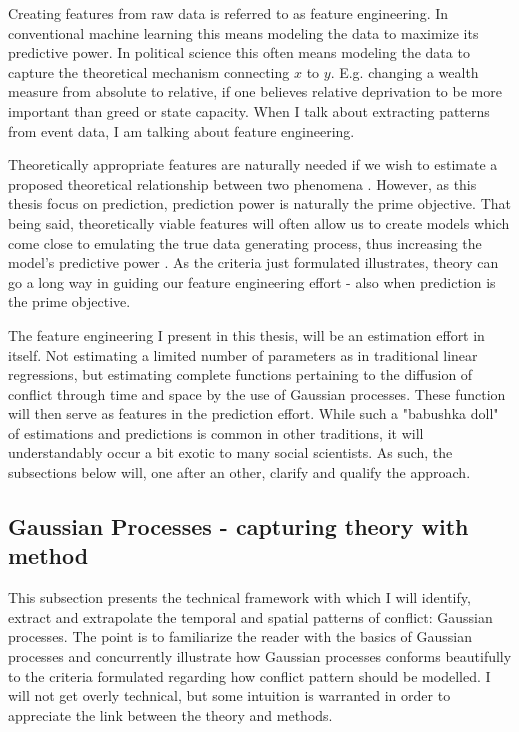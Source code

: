 \documentclass[a4paper]{article}
\begin{document}
Creating features from raw data is referred to as feature engineering. In conventional machine learning this means modeling the data to maximize its predictive power. In political science this often means modeling the data to capture the theoretical mechanism connecting $x$ to $y$. E.g. changing a wealth measure from absolute to relative, if one believes relative deprivation to be more important than greed or state capacity. When I talk about extracting patterns from event data, I am talking about feature engineering.\par

Theoretically appropriate features are naturally needed if we wish to estimate a proposed theoretical relationship between two phenomena \citep{Blimes_2006, Cederman_Gleditsch_Buhaug_2013}. However, as this thesis focus on prediction, prediction power is naturally the prime objective. That being said, theoretically viable features will often allow us to create models which come close to emulating the true data generating process, thus increasing the model's predictive power \citep[209-211]{Mcelreath_2018}. As the criteria just formulated illustrates, theory can go a long way in guiding our feature engineering effort - also when prediction is the prime objective.\par

The feature engineering I present in this thesis, will be an estimation effort in itself. Not estimating a limited number of parameters as in traditional linear regressions, but estimating complete functions pertaining to the diffusion of conflict through time and space by the use of Gaussian processes. These function will then serve as features in the prediction effort. While such a "babushka doll" of estimations and predictions is common in other traditions, it will understandably occur a bit exotic to many social scientists. As such, the subsections below will, one after an other, clarify and qualify the approach.\par


\subsection{Gaussian Processes - capturing theory with method}\label{GPS}  %

This subsection presents the technical framework with which I will identify, extract and extrapolate the temporal and spatial patterns of conflict: Gaussian processes. The point is to familiarize the reader with the basics of Gaussian processes and concurrently illustrate how Gaussian processes conforms beautifully to the criteria formulated regarding how conflict pattern should be modelled. I will not get overly technical, but some intuition is warranted in order to appreciate the link between the theory and methods.\par
\end{document}
